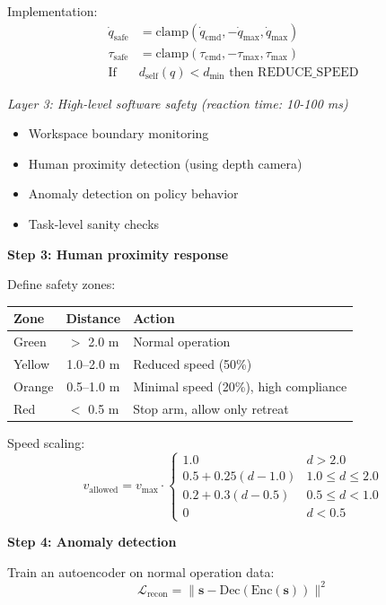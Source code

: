 \begin{example}
Implementation:
\begin{align}
\dot{q}_{\text{safe}} &= \text{clamp}(\dot{q}_{\text{cmd}}, -\dot{q}_{\max}, \dot{q}_{\max}) \\
\tau_{\text{safe}} &= \text{clamp}(\tau_{\text{cmd}}, -\tau_{\max}, \tau_{\max}) \\
\text{If } &d_{\text{self}}(q) < d_{\min} \text{ then REDUCE\_SPEED}
\end{align}

\textit{Layer 3: High-level software safety (reaction time: 10-100 ms)}
\begin{itemize}
    \item Workspace boundary monitoring
    \item Human proximity detection (using depth camera)
    \item Anomaly detection on policy behavior
    \item Task-level sanity checks
\end{itemize}

\textbf{Step 3: Human proximity response}

Define safety zones:

\begin{center}
\begin{tabular}{lcl}
\toprule
\textbf{Zone} & \textbf{Distance} & \textbf{Action} \\
\midrule
Green & $>$ 2.0 m & Normal operation \\
Yellow & 1.0--2.0 m & Reduced speed (50\%) \\
Orange & 0.5--1.0 m & Minimal speed (20\%), high compliance \\
Red & $<$ 0.5 m & Stop arm, allow only retreat \\
\bottomrule
\end{tabular}
\end{center}

Speed scaling:
\begin{equation}
v_{\text{allowed}} = v_{\max} \cdot \begin{cases}
1.0 & d > 2.0 \\
0.5 + 0.25(d - 1.0) & 1.0 \leq d \leq 2.0 \\
0.2 + 0.3(d - 0.5) & 0.5 \leq d < 1.0 \\
0 & d < 0.5
\end{cases}
\end{equation}

\textbf{Step 4: Anomaly detection}

Train an autoencoder on normal operation data:
\begin{equation}
\mathcal{L}_{\text{recon}} = \|\mathbf{s} - \text{Dec}(\text{Enc}(\mathbf{s}))\|^2
\end{equation}


\end{example}
